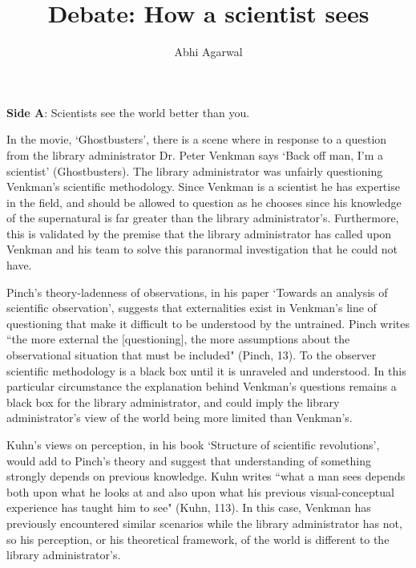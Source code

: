 \documentclass[11pt, oneside]{article}
\title{Debate: How a scientist sees\vspace{-0.4cm}}
\author{Abhi Agarwal\vspace{-1cm}}
\date{}
\begin{document}
\maketitle



\noindent \textbf{Side A}: Scientists see the world better than you.

\par In the movie, `Ghostbusters', there is a scene where in response to a question from the library administrator Dr. Peter Venkman says `Back off man, I'm a scientist' (Ghostbusters). The library administrator was unfairly questioning Venkman's scientific methodology. Since Venkman is a scientist he has expertise in the field, and should be allowed to question as he chooses since his knowledge of the supernatural is far greater than the library administrator's. Furthermore, this is validated by the premise that the library administrator has called upon Venkman and his team to solve this paranormal investigation that he could not have.


\par Pinch's theory-ladenness of observations, in his paper `Towards an analysis of scientific observation', suggests that externalities exist in Venkman's line of questioning that make it difficult to be understood by the untrained. Pinch writes ``the more external the [questioning], the more assumptions about the observational situation that must be included" (Pinch, 13). To the observer scientific methodology is a black box until it is unraveled and understood. In this particular circumstance the explanation behind Venkman's questions remains a black box for the library administrator, and could imply the library administrator's view of the world being more limited than Venkman's.

\par Kuhn's views on perception, in his book `Structure of scientific revolutions', would add to Pinch's theory and suggest that understanding of something strongly depends on previous knowledge. Kuhn writes ``what a man sees depends both upon what he looks at and also upon what his previous visual-conceptual experience has taught him to see" (Kuhn, 113). In this case, Venkman has previously encountered similar scenarios while the library administrator has not, so his perception, or his theoretical framework, of the world is different to the library administrator's. 
\end{document}
